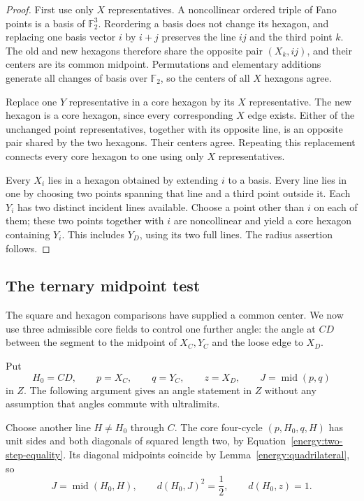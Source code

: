 \begin{proof}
First use only $X$ representatives.  A noncollinear ordered triple
of Fano points is a basis of $\mathbb F_2^3$.  Reordering a basis
does not change its hexagon, and replacing one basis vector $i$ by
$i+j$ preserves the line $ij$ and the third point $k$.  The old and
new hexagons therefore share the opposite pair $(X_k,ij)$, and their
centers are its common midpoint.  Permutations and elementary
additions generate all changes of basis over $\mathbb F_2$, so the
centers of all $X$ hexagons agree.

Replace one $Y$ representative in a core hexagon by its $X$
representative.  The new hexagon is a core hexagon, since every corresponding
$X$ edge exists.  Either of the unchanged point representatives,
together with its opposite line, is an opposite pair shared by the
two hexagons.  Their centers agree.  Repeating this replacement
connects every core hexagon to one using only $X$ representatives.

Every $X_i$ lies in a hexagon obtained by extending $i$ to a basis.
Every line lies in one by choosing two points spanning that line
and a third point outside it.  Each $Y_i$ has two distinct incident
lines available.  Choose a point other than $i$ on each of them;
these two points together with $i$ are noncollinear and yield a
core hexagon containing $Y_i$.  This includes $Y_D$, using its two
full lines.  The radius assertion follows.
\end{proof}

\subsection{The ternary midpoint test}

The square and hexagon comparisons have supplied a common center.
We now use three admissible core fields to control one further angle: the angle
at $CD$ between the segment to the midpoint of $X_C,Y_C$ and the loose
edge to $X_D$.

Put
\[
 H_0=CD,\qquad p=X_C,\qquad q=Y_C,\qquad z=X_D,
 \qquad J=\operatorname{mid}(p,q)
\]
in $Z$.  The following argument gives an angle statement in $Z$
without any assumption that angles commute with ultralimits.

Choose another line $H\ne H_0$ through $C$.  The core four-cycle
$(p,H_0,q,H)$ has unit sides and both diagonals of squared length
two, by Equation~\eqref{energy:two-step-equality}.  Its diagonal
midpoints coincide by Lemma~\ref{energy:quadrilateral}, so
\begin{equation}\label{energy:ternary-radii}
 J=\operatorname{mid}(H_0,H),\qquad
 d(H_0,J)^2=\frac12,\qquad d(H_0,z)=1.
\end{equation}

